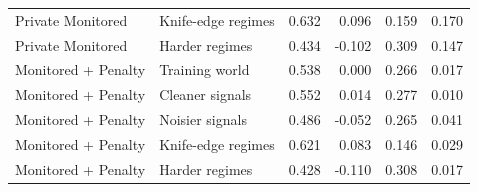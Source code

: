 \begin{tabular}{llrrrr}
Private Monitored & Knife-edge regimes & 0.632 & 0.096 & 0.159 & 0.170 \\
Private Monitored & Harder regimes & 0.434 & -0.102 & 0.309 & 0.147 \\
Monitored + Penalty & Training world & 0.538 & 0.000 & 0.266 & 0.017 \\
Monitored + Penalty & Cleaner signals & 0.552 & 0.014 & 0.277 & 0.010 \\
Monitored + Penalty & Noisier signals & 0.486 & -0.052 & 0.265 & 0.041 \\
Monitored + Penalty & Knife-edge regimes & 0.621 & 0.083 & 0.146 & 0.029 \\
Monitored + Penalty & Harder regimes & 0.428 & -0.110 & 0.308 & 0.017 \\
\bottomrule
\end{tabular}
